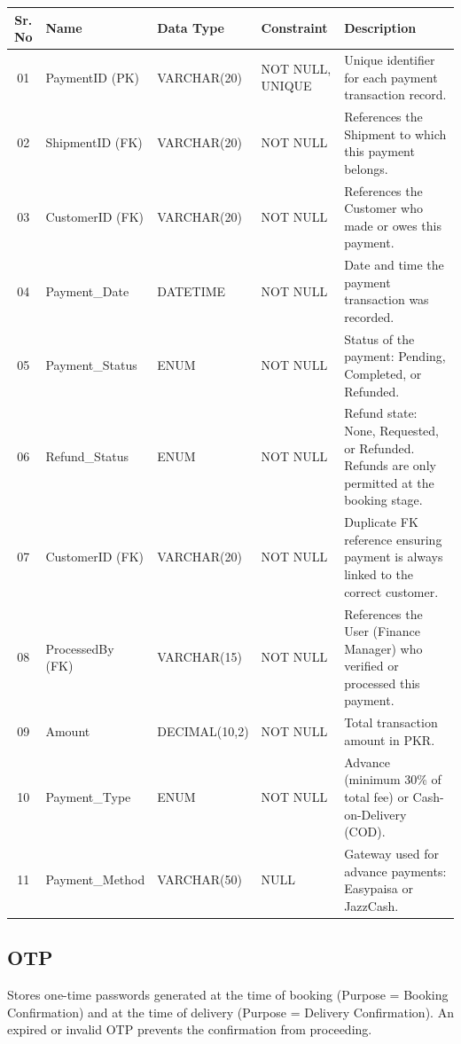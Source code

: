 \documentclass[12pt,a4paper]{report}
\begin{document}
\begin{longtable}{|c|p{3.8cm}|p{2.5cm}|p{3.5cm}|p{5.5cm}|}
\hline
\textbf{Sr. No} & \textbf{Name} & \textbf{Data Type} & \textbf{Constraint} & \textbf{Description} \\
\hline
01 & PaymentID (PK) & VARCHAR(20) & NOT NULL, UNIQUE & Unique identifier for each payment transaction record. \\
\hline
02 & ShipmentID (FK) & VARCHAR(20) & NOT NULL & References the Shipment to which this payment belongs. \\
\hline
03 & CustomerID (FK) & VARCHAR(20) & NOT NULL & References the Customer who made or owes this payment. \\
\hline
04 & Payment\_Date & DATETIME & NOT NULL & Date and time the payment transaction was recorded. \\
\hline
05 & Payment\_Status & ENUM & NOT NULL & Status of the payment: Pending, Completed, or Refunded. \\
\hline
06 & Refund\_Status & ENUM & NOT NULL & Refund state: None, Requested, or Refunded. Refunds are only permitted at the booking stage. \\
\hline
07 & CustomerID (FK) & VARCHAR(20) & NOT NULL & Duplicate FK reference ensuring payment is always linked to the correct customer. \\
\hline
08 & ProcessedBy (FK) & VARCHAR(15) & NOT NULL & References the User (Finance Manager) who verified or processed this payment. \\
\hline
09 & Amount & DECIMAL(10,2) & NOT NULL & Total transaction amount in PKR. \\
\hline
10 & Payment\_Type & ENUM & NOT NULL & Advance (minimum 30\% of total fee) or Cash-on-Delivery (COD). \\
\hline
11 & Payment\_Method & VARCHAR(50) & NULL & Gateway used for advance payments: Easypaisa or JazzCash. \\
\hline
\end{longtable}


\subsection{OTP}

Stores one-time passwords generated at the time of booking (Purpose = Booking Confirmation) and at the time of delivery (Purpose = Delivery Confirmation). An expired or invalid OTP prevents the confirmation from proceeding.
\end{document}

